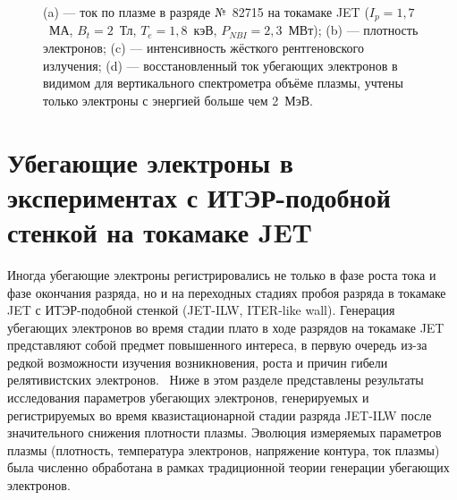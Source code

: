 \begin{figure}[ht!]
  \caption{ (a) --- ток по плазме в разряде №~82715 на токамаке JET ($I_p = 1,7$~МА, $B_t = 2$~Тл, $T_e = 1,8$~кэВ, $P_{NBI} = 2,3$~МВт); (b) ---  плотность электронов; (c) ---  интенсивность жёсткого рентгеновского излучения; (d) --- восстановленный ток убегающих электронов в видимом для вертикального спектрометра объёме плазмы, учтены только электроны с энергией больше чем 2~МэВ.~\cite{Shevelev2013} }
  \label{fig:jetPulseParams82715}
\end{figure}



\FloatBarrier
\section{Убегающие электроны в экспериментах с ИТЭР-подобной стенкой на токамаке JET}

Иногда убегающие электроны регистрировались не только в фазе роста тока и фазе окончания разряда, но и на переходных стадиях пробоя разряда в токамаке JET с ИТЭР-подобной стенкой (JET-ILW, ITER-like wall). Генерация убегающих электронов во время стадии плато в ходе разрядов на токамаке JET представляют собой предмет повышенного интереса, в первую очередь из-за редкой возможности изучения возникновения, роста и причин гибели релятивистских электронов.~\cite{Granetz2014} Ниже в этом разделе представлены результаты исследования параметров убегающих электронов, генерируемых и регистрируемых во время квазистационарной стадии разряда JET-ILW после значительного снижения плотности плазмы. Эволюция измеряемых параметров плазмы (плотность, температура электронов, напряжение контура, ток плазмы) была численно обработана в рамках традиционной теории генерации убегающих электронов.~\cite{Plyusnin2015}


